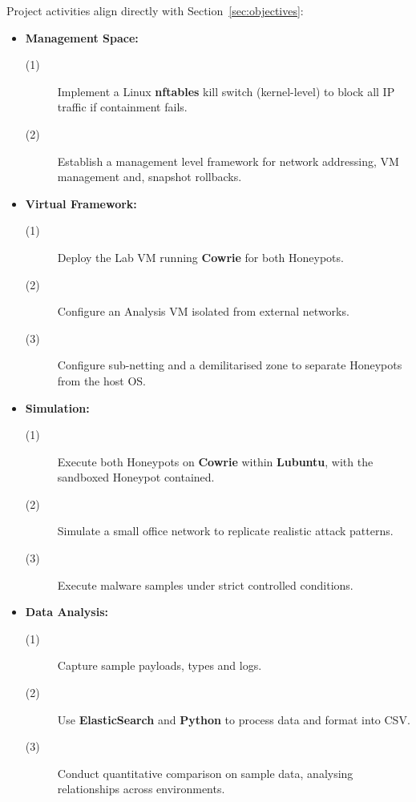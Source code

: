\documentclass[a4paper,12pt,oneside]{book}			%
\begin{document}
Project activities align directly with Section~\ref{sec:objectives}:
\begin{itemize}
	\item\textbf{Management Space:}
		\begin{description}
			\item[(1)] Implement a Linux \textbf{nftables} kill switch (kernel-level) to block all IP traffic if containment fails.
			\item[(2)] Establish a management level framework for network addressing, VM management and, snapshot rollbacks.
		\end{description}

	\item\textbf{Virtual Framework:}
		\begin{description}
			\item[(1)] Deploy the Lab VM running \textbf{Cowrie} for both Honeypots.
			\item[(2)] Configure an Analysis VM isolated from external networks.
			\item[(3)] Configure sub-netting and a demilitarised zone to separate Honeypots from the host OS.
			\end{description}

	\item\textbf{Simulation:}
		\begin{description}
			\item[(1)] Execute both Honeypots on \textbf{Cowrie} within \textbf{Lubuntu}, with the sandboxed Honeypot contained.
			\item[(2)] Simulate a small office network to replicate realistic attack patterns.
			\item[(3)] Execute malware samples under strict controlled conditions.
		\end{description}

	\item\textbf{Data Analysis:}
		\begin{description}
			\item[(1)] Capture sample payloads, types and logs.
			\item[(2)] Use \textbf{ElasticSearch} and \textbf{Python} to process data and format into CSV.
			\item[(3)] Conduct quantitative comparison on sample data, analysing relationships across environments.
		\end{description}

\end{itemize}
\end{document}
